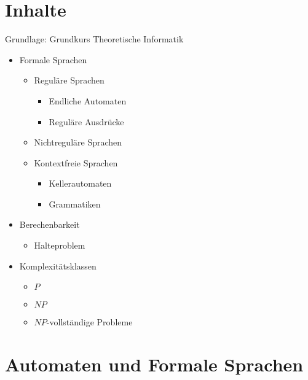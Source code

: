 






\maketitle
\newpage
\tableofcontents
\newpage

\section*{Inhalte}
Grundlage: Grundkurs Theoretische Informatik \cite{hollas2015grundkurs}
\begin{itemize}
\item Formale Sprachen
\begin{itemize}
\item Reguläre Sprachen
\begin{itemize}
\item Endliche Automaten
\item Reguläre Ausdrücke
\end{itemize}
\item Nichtreguläre Sprachen
\item Kontextfreie Sprachen
\begin{itemize}
\item Kellerautomaten
\item Grammatiken
\end{itemize}
\end{itemize}
\item Berechenbarkeit
\begin{itemize}
\item Halteproblem
\end{itemize}
\item Komplexitätsklassen
\begin{itemize}
\item $P$
\item $NP$
\item $NP$-vollständige Probleme
\end{itemize}
\end{itemize}

\section{Automaten und Formale Sprachen}
